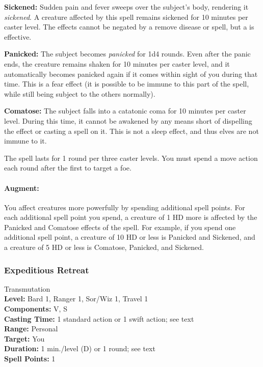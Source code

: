 \textbf{Sickened:} Sudden pain and fever sweeps over the subject's body, rendering it \emph{sickened}.
A creature affected by this spell remains sickened for 10 minutes per caster level. 
The effects cannot be negated by a remove disease or  spell, but a  is effective.

\textbf{Panicked:} The subject becomes \emph{panicked} for 1d4 rounds. 
Even after the panic ends, the creature remains shaken for 10 minutes per caster level, and 
it automatically becomes panicked again if it comes within sight of you during that time. 
This is a fear effect (it is possible to be immune to this part of the spell, while still being subject to the others normally).

\textbf{Comatose:} The subject falls into a catatonic coma for 10 minutes per caster level. 
During this time, it cannot be awakened by any means short of dispelling the effect or casting a  spell on it. 
This is not a sleep effect, and thus elves are not immune to it.

The spell lasts for 1 round per three caster levels. You must spend a move action each round after the first to target a foe. 

\paragraph{Augment:} You affect creatures more powerfully by spending additional spell points.
For each additional spell point you spend, a creature of 1 HD more is affected by the Panicked and Comatose effects of the spell.
For example, if you spend one additional spell point, a creature of 10 HD or less is Panicked and Sickened, and a creature of 5 HD or less is Comatose, Panicked, and Sickened.
\subsubsection{Expeditious Retreat}
\label{Spell:ExpeditiousRetreat}
Transmutation
\\ \textbf{Level:} Bard 1, Ranger 1, Sor/Wiz 1, Travel 1
\\ \textbf{Components:} V, S
\\ \textbf{Casting Time:} 1 standard action or 1 swift action; see text
\\ \textbf{Range:} Personal
\\ \textbf{Target:} You
\\ \textbf{Duration:} 1 min./level (D) or 1 round; see text
\\ \textbf{Spell Points:} 1

